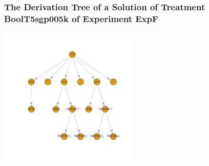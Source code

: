  \begin{frame}
 \frametitle{ The Derivation Tree of a Solution of Treatment BoolT5sgp005k of Experiment ExpF }
 \begin{center}
\includegraphics[width=0.5\textwidth, angle=0]
{ExpFDerivationTreeFigure003.pdf}
 \end{center}
 \label{templateReport/ExpFDerivationTreeFigure003.pdf}  
 \end{frame}

